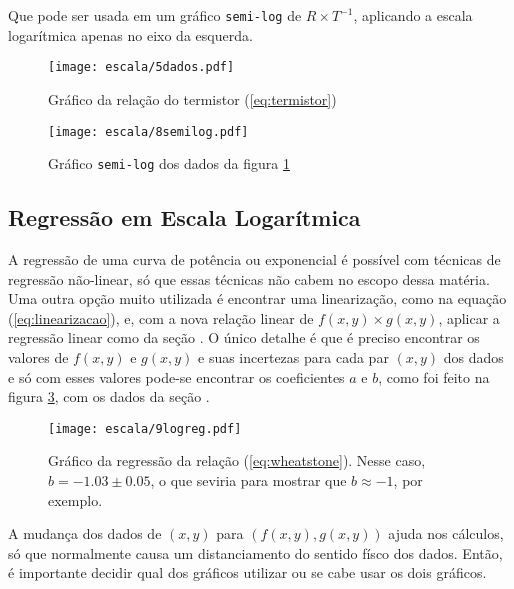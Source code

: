     Que pode ser usada em um gráfico \texttt{semi-log} de $R \times T^{-1}$, aplicando a escala logarítmica apenas no eixo da esquerda.

    \begin{figure}[htbp]
        \centering
        \texttt{[image: escala/5dados.pdf]}

        \caption{Gráfico da relação do termistor (\ref{eq:termistor})}
        \label{fig:escala:semilog:dados}
    \end{figure}

    \begin{figure}[htbp]
        \centering
        \texttt{[image: escala/8semilog.pdf]}

        \caption{Gráfico \texttt{semi-log} dos dados da figura \ref{fig:escala:semilog:dados}}
        \label{fig:escala:semilog:resultado}
    \end{figure}


\subsection{Regressão em Escala Logarítmica}

    A regressão de uma curva de potência ou exponencial é possível com técnicas de regressão não-linear, só que essas técnicas não cabem no escopo dessa matéria. Uma outra opção muito utilizada é encontrar uma linearização, como na equação (\ref{eq:linearizacao}), e, com a nova relação linear de $f(x, y) \times g(x, y)$, aplicar a regressão linear como da seção . O único detalhe é que é preciso encontrar os valores de $f(x, y)$ e $g(x, y)$ e suas incertezas para cada par $(x, y)$ dos dados e só com esses valores pode-se encontrar os coeficientes $a$ e $b$, como foi feito na figura \ref{fig:escala:regres}, com os dados da seção .

    \begin{figure}[htbp]
        \centering
        \texttt{[image: escala/9logreg.pdf]}

        \caption{Gráfico da regressão da relação (\ref{eq:wheatstone}). Nesse caso, $b = -1.03 \pm 0.05$, o que seviria para mostrar que $b \approx -1$, por exemplo.}
        \label{fig:escala:regres}
    \end{figure}

    A mudança dos dados de $(x, y)$ para $(f(x, y), g(x, y))$ ajuda nos cálculos, só que normalmente causa um distanciamento do sentido físco dos dados. Então, é importante decidir qual dos gráficos utilizar ou se cabe usar os dois gráficos.
